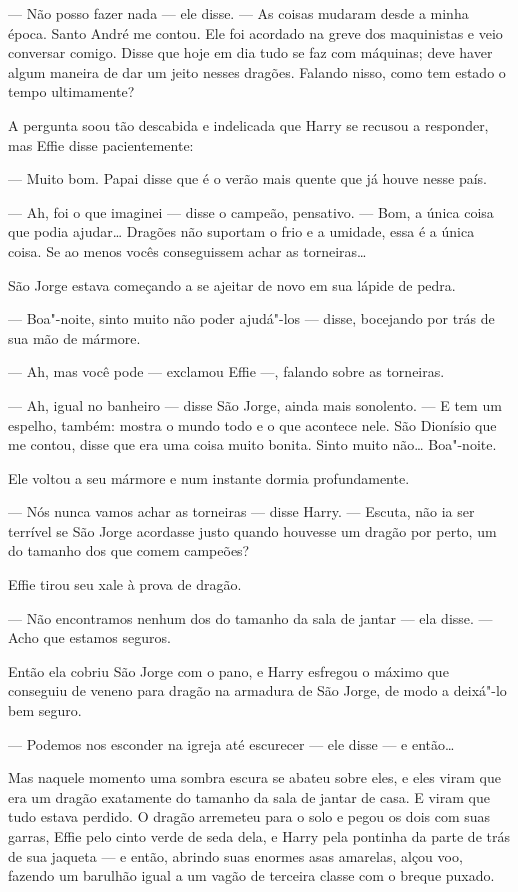 --- Não posso fazer nada --- ele disse. --- As coisas mudaram desde a minha
época. Santo André me contou. Ele foi acordado na greve dos
maquinistas e veio conversar comigo. Disse que hoje em dia tudo se
faz com máquinas; deve haver algum maneira de dar um jeito nesses
dragões. Falando nisso, como tem estado o tempo ultimamente?

A pergunta soou tão descabida e indelicada que Harry se recusou a
responder, mas Effie disse pacientemente:

--- Muito bom. Papai disse que é o verão mais quente que já houve nesse
país.

--- Ah, foi o que imaginei --- disse o campeão, pensativo. --- Bom, a única
coisa que podia ajudar\ldots{} Dragões não suportam o frio e a umidade, essa
é a única coisa. Se ao menos vocês conseguissem achar as torneiras\ldots{}

São Jorge estava começando a se ajeitar de novo em sua lápide de
pedra.

--- Boa"-noite, sinto muito não poder ajudá"-los --- disse, bocejando por
trás de sua mão de mármore.

--- Ah, mas você pode --- exclamou Effie ---, falando sobre as torneiras.

--- Ah, igual no banheiro --- disse São Jorge, ainda mais sonolento. --- E
tem um espelho, também: mostra o mundo todo e o que acontece nele.
São Dionísio que me contou, disse que era uma coisa muito bonita.
Sinto muito não\ldots{} Boa"-noite.

Ele voltou a seu mármore e num instante dormia profundamente.

--- Nós nunca vamos achar as torneiras --- disse Harry. --- Escuta, não ia
ser terrível se São Jorge acordasse justo quando houvesse um dragão
por perto, um do tamanho dos que comem campeões?

Effie tirou seu xale à prova de dragão.

--- Não encontramos nenhum dos do tamanho da sala de jantar --- ela disse.
--- Acho que estamos seguros.

Então ela cobriu São Jorge com o pano, e Harry esfregou o máximo que
conseguiu de veneno para dragão na armadura de São Jorge, de modo a
deixá"-lo bem seguro.

--- Podemos nos esconder na igreja até escurecer --- ele disse --- e então\ldots{}

Mas naquele momento uma sombra escura se abateu sobre eles, e eles
viram que era um dragão exatamente do tamanho da sala de jantar de
casa. E viram que tudo estava perdido. O dragão arremeteu para o solo
e pegou os dois com suas garras, Effie pelo cinto verde de seda dela,
e Harry pela pontinha da parte de trás de sua jaqueta --- e
então, abrindo suas enormes asas amarelas, alçou voo, fazendo um
barulhão igual a um vagão de terceira classe com o breque puxado.

